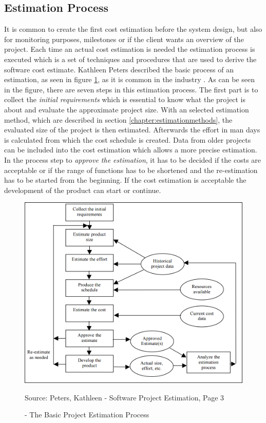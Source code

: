 \subsection{Estimation Process}

It is common to create the first cost estimation before the system design, but also for monitoring purposes, milestones or if the client wants an overview of the project. Each time an actual cost estimation is needed the estimation process is executed which is a set of techniques and procedures that are used to derive the software cost estimate. Kathleen Peters described the basic process of an estimation, as seen in figure \ref{fig:basicEstimationProcess}, as it is common in the industry \cite{estimationProcess}. As can be seen in the figure, there are seven steps in this estimation process. The first part is to collect the \textit{initial requirements} which is essential to know what the project is about and evaluate the approximate project size. With an selected estimation method, which are described in section \ref{chapter:estimationmethods}, the evaluated size of the project is then estimated. Afterwards the effort in man days is calculated from which the cost schedule is created. Data from older projects can be included into the cost estimation which allows a more precise estimation. In the process step to \textit{approve the estimation}, it has to be decided if the costs are acceptable or if the range of functions has to be shortened and the re-estimation has to be started from the beginning. If the cost estimation is acceptable the development of the product can start or continue.\\
\begin{figure}[h] 
	\centering 
	\includegraphics[width=13cm]{images/estimationProcess.PNG} 
	\caption{- The Basic Project Estimation Process}
	Source: Peters, Kathleen - Software Project Estimation, Page 3  
	\label{fig:basicEstimationProcess}
\end{figure}\\
